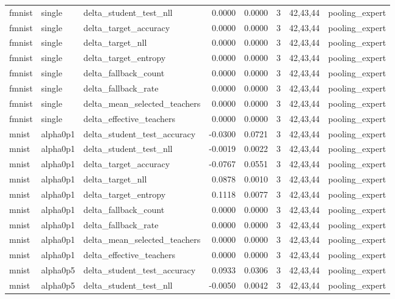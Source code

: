 \begin{tabular}{lllrrrll}
fmnist & single & delta\_student\_test\_nll & 0.0000 & 0.0000 & 3 & 42,43,44 & pooling\_expert \\
fmnist & single & delta\_target\_accuracy & 0.0000 & 0.0000 & 3 & 42,43,44 & pooling\_expert \\
fmnist & single & delta\_target\_nll & 0.0000 & 0.0000 & 3 & 42,43,44 & pooling\_expert \\
fmnist & single & delta\_target\_entropy & 0.0000 & 0.0000 & 3 & 42,43,44 & pooling\_expert \\
fmnist & single & delta\_fallback\_count & 0.0000 & 0.0000 & 3 & 42,43,44 & pooling\_expert \\
fmnist & single & delta\_fallback\_rate & 0.0000 & 0.0000 & 3 & 42,43,44 & pooling\_expert \\
fmnist & single & delta\_mean\_selected\_teachers & 0.0000 & 0.0000 & 3 & 42,43,44 & pooling\_expert \\
fmnist & single & delta\_effective\_teachers & 0.0000 & 0.0000 & 3 & 42,43,44 & pooling\_expert \\
mnist & alpha0p1 & delta\_student\_test\_accuracy & -0.0300 & 0.0721 & 3 & 42,43,44 & pooling\_expert \\
mnist & alpha0p1 & delta\_student\_test\_nll & -0.0019 & 0.0022 & 3 & 42,43,44 & pooling\_expert \\
mnist & alpha0p1 & delta\_target\_accuracy & -0.0767 & 0.0551 & 3 & 42,43,44 & pooling\_expert \\
mnist & alpha0p1 & delta\_target\_nll & 0.0878 & 0.0010 & 3 & 42,43,44 & pooling\_expert \\
mnist & alpha0p1 & delta\_target\_entropy & 0.1118 & 0.0077 & 3 & 42,43,44 & pooling\_expert \\
mnist & alpha0p1 & delta\_fallback\_count & 0.0000 & 0.0000 & 3 & 42,43,44 & pooling\_expert \\
mnist & alpha0p1 & delta\_fallback\_rate & 0.0000 & 0.0000 & 3 & 42,43,44 & pooling\_expert \\
mnist & alpha0p1 & delta\_mean\_selected\_teachers & 0.0000 & 0.0000 & 3 & 42,43,44 & pooling\_expert \\
mnist & alpha0p1 & delta\_effective\_teachers & 0.0000 & 0.0000 & 3 & 42,43,44 & pooling\_expert \\
mnist & alpha0p5 & delta\_student\_test\_accuracy & 0.0933 & 0.0306 & 3 & 42,43,44 & pooling\_expert \\
mnist & alpha0p5 & delta\_student\_test\_nll & -0.0050 & 0.0042 & 3 & 42,43,44 & pooling\_expert \\

\end{tabular}
